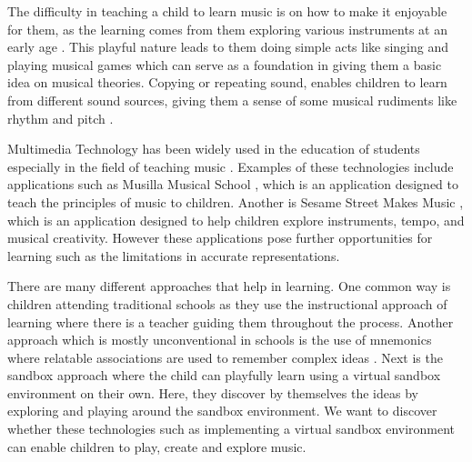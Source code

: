 The difficulty in teaching a child to learn music is on how to make it enjoyable for them, as the learning comes from them exploring various instruments at an early age \cite{ghazali2005minds}. This playful nature leads to them doing simple acts like singing and playing musical games which can serve as a foundation in giving them a basic idea on musical theories. Copying or repeating sound, enables children to learn from different sound sources, giving them a sense of some musical rudiments like rhythm and pitch \cite{mcpherson2015child}. 


Multimedia Technology has been widely used in the education of students especially in the field of teaching music \cite{tong2016design}. Examples of these technologies include applications such as Musilla Musical School \cite{educationalappstore2017}, which is an application designed to teach the principles of music to children. Another is Sesame Street Makes Music \cite{educationalappstore2015}, which is an application designed to help children explore instruments, tempo, and musical creativity. However these applications pose further opportunities for learning such as the limitations in accurate representations.


There are many different approaches that help in learning. One common way is children attending traditional schools as they use the instructional approach of learning where there is a teacher guiding them throughout the process. Another approach which is mostly unconventional in schools is the use of mnemonics where relatable associations are used to remember complex ideas \cite{putnam2015mnemonics}. Next is the sandbox approach where the child can playfully learn using a virtual sandbox environment on their own. Here, they discover by themselves the ideas by exploring and playing around the sandbox environment. We want to discover whether these technologies such as implementing a virtual sandbox environment can enable children to play, create and explore music.


